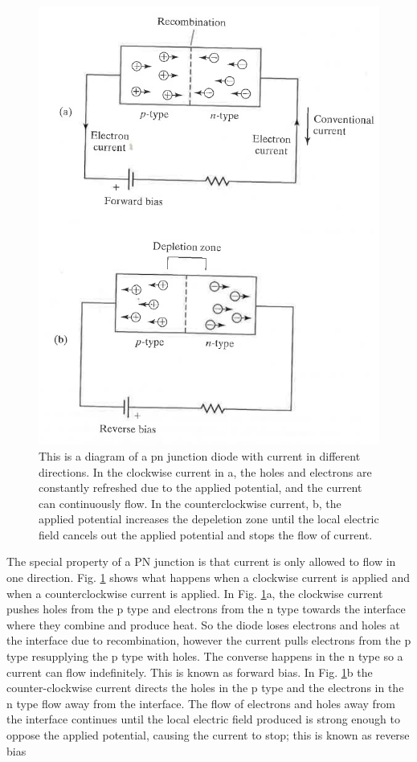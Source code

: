 \documentclass[ notitlepage, numerical, 11pt]{revtex4-1} %
\begin{document}
\begin{figure}[H]
\centerline{\includegraphics[scale=.7]{pnJunction.png}}
\caption{This is a diagram of a pn junction diode with current in different directions. In the clockwise current in a, the holes and electrons are constantly refreshed due to the applied potential, and the current can continuously flow. In the counterclockwise current, b, the applied potential increases the depeletion zone until the local electric field cancels out the applied potential and stops the flow of current.}
\label{pnJunction}
\end{figure}

The special property of a PN junction is that current is only allowed to flow in one direction. Fig. \ref{pnJunction} shows what happens when a clockwise current is applied and when a counterclockwise current is applied. In Fig. \ref{pnJunction}a, the clockwise current pushes holes from the p type and electrons from the n type towards the interface where they combine and produce heat. So the diode loses electrons and holes at the interface due to recombination, however the current pulls electrons from the p type resupplying the p type with holes. The converse happens in the n type so a current can flow indefinitely. This is known as forward bias. In Fig. \ref{pnJunction}b the counter-clockwise current directs the holes in the p type and the electrons in the n type flow away from the interface. The flow of electrons and holes away from the interface continues until the local electric field produced is strong enough to oppose the applied potential, causing the current to stop; this is known as reverse bias \cite{thermo} 
\end{document}
